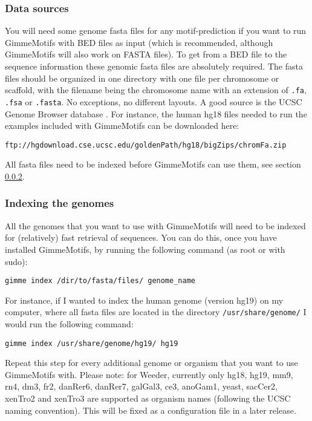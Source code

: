 \documentclass[11pt]{article}
\begin{document}
\subsubsection{Data sources}
You will need some genome fasta files for any motif-prediction if you want to run GimmeMotifs with BED files as input (which is recommended, although GimmeMotifs will also work on FASTA files). To get from a BED file to the sequence information these genomic fasta files are absolutely required. The fasta files should be organized in one directory with one file per chromosome or scaffold, with the filename being the chromosome name with an extension of \texttt{.fa}, \texttt{.fsa} or \texttt{.fasta}. No exceptions, no different layouts. A good source is the UCSC Genome Browser database \cite{rhead_ucsc_2010}. For instance, the human hg18 files needed to run the examples included with GimmeMotifs can be downloaded here:
\begin{verbatim}
ftp://hgdownload.cse.ucsc.edu/goldenPath/hg18/bigZips/chromFa.zip
 \end{verbatim}
All fasta files need to be indexed before GimmeMotifs can use them, see section \ref{sec:indexing}.

\subsubsection{Indexing the genomes}
\label{sec:indexing}
All the genomes that you want to use with GimmeMotifs will need to be indexed for (relatively) fast retrieval of sequences. You can do this, once you have installed GimmeMotifs, by running the following command (as root or with sudo):
\begin{verbatim}
gimme index /dir/to/fasta/files/ genome_name
\end{verbatim}
For instance, if I wanted to index the human genome (version hg19) on my computer, where all fasta files are located in the directory \texttt{/usr/share/genome/} I would run the following command:
\begin{verbatim}
gimme index /usr/share/genome/hg19/ hg19
\end{verbatim}
Repeat this step for every additional genome or organism that you want to use GimmeMotifs with. Please note: for Weeder, currently only hg18, hg19, mm9, rn4, dm3, fr2, danRer6, danRer7, galGal3, ce3, anoGam1, yeast, sacCer2, xenTro2 and xenTro3 are supported as organism names (following the UCSC naming convention). This will be fixed as a configuration file in a later release.
\end{document}

